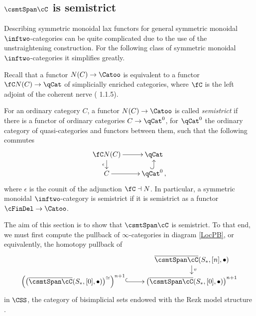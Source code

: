 \documentclass[a4paper]{article}
\numberwithin{equation}{section}
\begin{document}
\subsection{\texorpdfstring{$\csmtSpan \cC$}{Span(C)} is semistrict}
\label{StrictBispan}
Describing symmetric monoidal lax functors for general symmetric monoidal $\inftwo$-categories can be quite complicated due to the use of the unstraightening construction. For the following class of symmetric monoidal $\inftwo$-categories it simplifies greatly.

Recall that a functor $N(C) \to \Catoo$ is equivalent to a functor $\fC N(C)\to \qCat$ of simplicially enriched categories, where $\fC$ is the left adjoint of the coherent nerve (\cite{HTT} 1.1.5).
\begin{defn}
For an ordinary category $C$, a functor $N(C) \to \Catoo$ is called {\em semistrict} if there is a functor of ordinary categories $C \to \qCat^0$, for $\qCat^0$ the ordinary category of quasi-categories and functors between them, such that the following commutes
\begin{equation*}
 \xymatrixrowsep{.9pc} \xymatrix{ \fC N(C) \ar[d]_-{\epsilon} \ar[r] & \qCat \\
 C \ar[r] & \qCat^0 \ar@{^{(}->}[u]\, , }
\end{equation*}
where $\epsilon$ is the counit of the adjunction $\fC \dashv N$. In particular, a symmetric monoidal $\inftwo$-category is semistrict if it is semistrict as a functor $\cFinDel \to \Catoo$.
\end{defn}


The aim of this section is to show that $\csmtSpan \cC$ is semistrict. To that end, we must first compute the pullback of $\infty$-categories in diagram \ref{LocPB}, or equivalently, the homotopy pullback of
\begin{equation}
\label{LocPBCSS}
 \xymatrixrowsep{.8pc}\xymatrix{   & \overline{\csmtSpan \cC}(S_*,[n], \bullet) \ar[d]^-v \\
 \left(\left(\overline{\csmtSpan \cC}(S_*,[0],\bullet)\right)^\simeq\right)^{n+1} \ar@{^{(}->}[r] & \left(\overline{\csmtSpan \cC}(S_*,[0],\bullet)\right)^{n+1} }
\end{equation}
in $\CSS$, the category of bisimplicial sets endowed with the Rezk model structure \cite{RezkCSS}.
\end{document}
